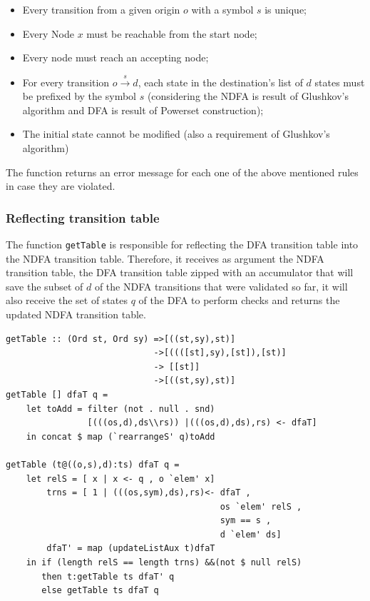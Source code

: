 \begin{itemize}
    \item Every transition from a given origin $o$ with a symbol $s$ is unique;
    \item Every Node $x$ must be reachable from the start node;
    \item Every node must reach an accepting node;
    \item For every transition $o \xrightarrow{s} d $, each state in the destination's list of $d$ states must be prefixed by the symbol $s$ (considering the NDFA is result of Glushkov's algorithm and DFA is result of Powerset construction);
    \item The initial state cannot be modified (also a requirement of Glushkov's algorithm)
\end{itemize}

The function returns an error message for each one of the above mentioned rules in case they are violated. 
    
\subsubsection{Reflecting transition table}
The function \texttt{getTable} is responsible for reflecting the DFA transition table into the NDFA transition table. Therefore, it receives as argument the NDFA transition table, the DFA transition table zipped with an accumulator that will save the subset of $d$ of the NDFA transitions that were validated so far, it will also receive the set of states $q$ of the DFA to perform checks and returns the updated NDFA transition table. 


\vspace{5mm}
\begin{verbatim}
getTable :: (Ord st, Ord sy) =>[((st,sy),st)] 
                             ->[((([st],sy),[st]),[st)]
                             -> [[st]] 
                             ->[((st,sy),st)]
getTable [] dfaT q = 
    let toAdd = filter (not . null . snd)
                [(((os,d),ds\\rs)) |(((os,d),ds),rs) <- dfaT]
    in concat $ map (`rearrangeS' q)toAdd
    
getTable (t@((o,s),d):ts) dfaT q = 
    let relS = [ x | x <- q , o `elem' x]
        trns = [ 1 | (((os,sym),ds),rs)<- dfaT , 
                                          os `elem' relS ,
                                          sym == s , 
                                          d `elem' ds]
        dfaT' = map (updateListAux t)dfaT
    in if (length relS == length trns) &&(not $ null relS) 
       then t:getTable ts dfaT' q
       else getTable ts dfaT q
\end{verbatim}

